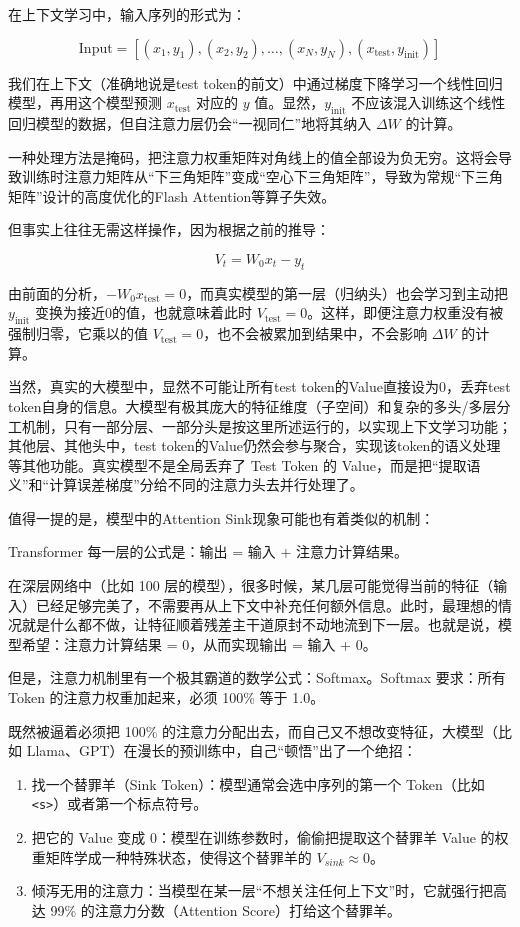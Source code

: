 在上下文学习中，输入序列的形式为：

\[
\mathrm{Input}=[(x_1,y_1),(x_2,y_2),\ldots,(x_N,y_N),(x_{\mathrm{test}},y_{\mathrm{init}})]
\]

我们在上下文（准确地说是test token的前文）中通过梯度下降学习一个线性回归模型，再用这个模型预测 \(x_{\mathrm{test}}\) 对应的 \(y\) 值。显然，\(y_{\mathrm{init}}\) 不应该混入训练这个线性回归模型的数据，但自注意力层仍会``一视同仁''地将其纳入 \(\Delta W\) 的计算。

一种处理方法是掩码，把注意力权重矩阵对角线上的值全部设为负无穷。这将会导致训练时注意力矩阵从``下三角矩阵''变成``空心下三角矩阵''，导致为常规``下三角矩阵''设计的高度优化的Flash Attention等算子失效。

但事实上往往无需这样操作，因为根据之前的推导：

\[
V_t = W_0 x_t - y_t
\]

由前面的分析，\(-W_0x_{\mathrm{test}}=0\)，而真实模型的第一层（归纳头）也会学习到主动把 \(y_{\mathrm{init}}\) 变换为接近0的值，也就意味着此时 \(V_{\mathrm{test}}=0\)。这样，即便注意力权重没有被强制归零，它乘以的值 \(V_{\mathrm{test}}=0\)，也不会被累加到结果中，不会影响 \(\Delta W\) 的计算。

当然，真实的大模型中，显然不可能让所有test token的Value直接设为0，丢弃test token自身的信息。大模型有极其庞大的特征维度（子空间）和复杂的多头/多层分工机制，只有一部分层、一部分头是按这里所述运行的，以实现上下文学习功能；其他层、其他头中，test token的Value仍然会参与聚合，实现该token的语义处理等其他功能。真实模型不是全局丢弃了 Test Token 的 Value，而是把``提取语义''和``计算误差梯度''分给不同的注意力头去并行处理了。

值得一提的是，模型中的Attention Sink现象可能也有着类似的机制：

Transformer 每一层的公式是：输出 = 输入 + 注意力计算结果。

在深层网络中（比如 100 层的模型），很多时候，某几层可能觉得当前的特征（输入）已经足够完美了，不需要再从上下文中补充任何额外信息。此时，最理想的情况就是什么都不做，让特征顺着残差主干道原封不动地流到下一层。也就是说，模型希望：注意力计算结果 = 0，从而实现输出 = 输入 + 0。

但是，注意力机制里有一个极其霸道的数学公式：Softmax。Softmax 要求：所有 Token 的注意力权重加起来，必须 100\% 等于 1.0。

既然被逼着必须把 100\% 的注意力分配出去，而自己又不想改变特征，大模型（比如 Llama、GPT）在漫长的预训练中，自己``顿悟''出了一个绝招：

\begin{enumerate}
\def\labelenumi{\arabic{enumi}.}
\tightlist
\item
  找一个替罪羊（Sink Token）：模型通常会选中序列的第一个 Token（比如 \texttt{\textless{}s\textgreater{}}）或者第一个标点符号。
\item
  把它的 Value 变成 0：模型在训练参数时，偷偷把提取这个替罪羊 Value 的权重矩阵学成一种特殊状态，使得这个替罪羊的 \(V_{sink} \approx 0\)。
\item
  倾泻无用的注意力：当模型在某一层``不想关注任何上下文''时，它就强行把高达 99\% 的注意力分数（Attention Score）打给这个替罪羊。
\end{enumerate}

